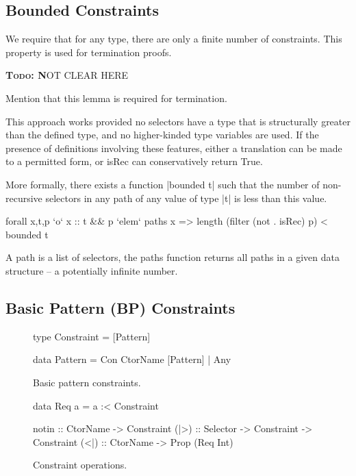 \documentclass[preprint]{sigplanconf}
\newcommand{\C}[1]{\textsf{#1}}
\newcommand{\todo}[1]{\textbf{\textsc{Todo:} #1}}
\begin{document}
\subsection{Bounded Constraints}
\label{sec:bounded}

We require that for any type, there are only a finite number of constraints. This property is used for termination proofs.

\todo NOT CLEAR HERE

Mention that this lemma is required for termination.

This approach works provided no selectors have a type that is structurally greater than the defined type, and no higher-kinded type variables are used. If the presence of definitions involving these features, either a translation can be made to a permitted form, or \C{isRec} can conservatively return True.

More formally, there exists a function |bounded t| such that the number of non-recursive selectors in any path of any value of type |t| is less than this value.

\begin{code}
forall x,t,p `o`  x :: t && p `elem` paths x =>
                  length (filter (not . isRec) p) < bounded t
\end{code}

A path is a list of selectors, the \C{paths} function returns all paths in a given data structure -- a potentially infinite number.


\subsection{Basic Pattern (BP) Constraints}
\label{sec:basic}

\begin{figure}
\begin{code}
type Constraint = [Pattern]

data Pattern  =  Con CtorName [Pattern]
              |  Any
\end{code}
\caption{Basic pattern constraints.}
\label{fig:basic}
\end{figure}

\begin{figure}
\begin{code}
data Req a = a :< Constraint

notin :: CtorName -> Constraint
(|>) :: Selector -> Constraint -> Constraint
(<|) :: CtorName -> Prop (Req Int)
\end{code}
\caption{Constraint operations.}
\label{fig:constraint}
\end{figure}
\end{document}
